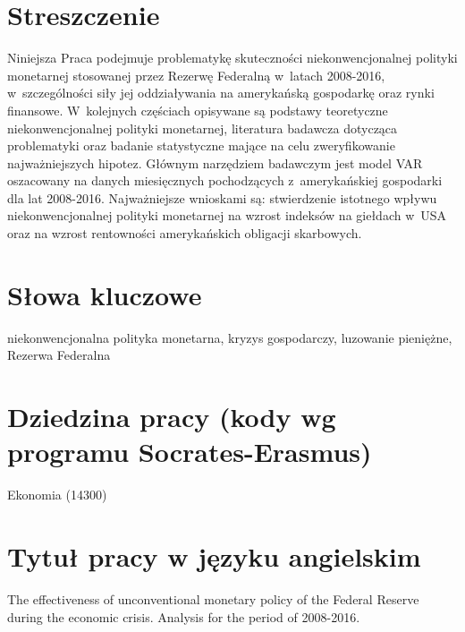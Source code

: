 
\newpage

\vspace{1cm}
\section*{Streszczenie}

\noindent Niniejsza Praca podejmuje problematykę skuteczności niekonwencjonalnej polityki monetarnej stosowanej przez Rezerwę Federalną w~latach 2008-2016, w~szczególności siły jej oddziaływania na amerykańską gospodarkę oraz rynki finansowe. W~kolejnych częściach opisywane są podstawy teoretyczne niekonwencjonalnej polityki monetarnej, literatura badawcza dotycząca problematyki oraz badanie statystyczne mające na celu zweryfikowanie najważniejszych hipotez. Głównym narzędziem badawczym jest model VAR oszacowany na danych miesięcznych pochodzących z~amerykańskiej gospodarki dla lat 2008-2016. Najważniejsze wnioskami są: stwierdzenie istotnego wpływu niekonwencjonalnej polityki monetarnej na wzrost indeksów na giełdach w~USA oraz na wzrost rentowności amerykańskich obligacji skarbowych.

\vspace{1cm}
\section*{Słowa kluczowe}

\noindent niekonwencjonalna polityka monetarna, kryzys gospodarczy, luzowanie pieniężne, Rezerwa Federalna

\vspace{1cm}
\section*{Dziedzina pracy (kody wg programu Socrates-Erasmus)}

\noindent Ekonomia (14300)

\vspace{1cm}
\section*{Tytuł pracy w języku angielskim}

\noindent The effectiveness of unconventional monetary policy of the Federal Reserve during the economic crisis. Analysis for the period of 2008-2016.
